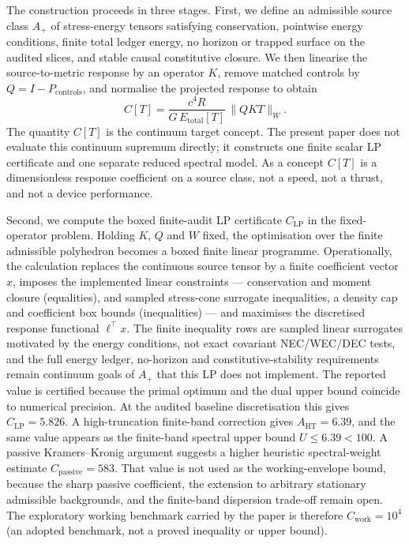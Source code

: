 \documentclass[11pt,a4paper]{article}
\begin{document}
The construction proceeds in three stages. First, we define an admissible source class $A_{+}$ of stress-energy tensors satisfying conservation, pointwise energy conditions, finite total ledger energy, no horizon or trapped surface on the audited slices, and stable causal constitutive closure. We then linearise the source-to-metric response by an operator $K$, remove matched controls by $Q=I-P_{\mathrm{controls}}$, and normalise the projected response to obtain
\[
C[T]=
\frac{c^{4}R}{G\,E_{\mathrm{total}}[T]}\,
\bigl\| Q K T \bigr\|_{W}.
\]
The quantity $C[T]$ is the continuum target concept. The present paper does not evaluate this continuum supremum directly; it constructs one finite scalar LP certificate and one separate reduced spectral model. As a concept $C[T]$ is a dimensionless response coefficient on a source class, not a speed, not a thrust, and not a device performance.

Second, we compute the boxed finite-audit LP certificate $C_{\mathrm{LP}}$ in the fixed-operator problem. Holding $K$, $Q$ and $W$ fixed, the optimisation over the finite admissible polyhedron becomes a boxed finite linear programme. Operationally, the calculation replaces the continuous source tensor by a finite coefficient vector $x$, imposes the implemented linear constraints --- conservation and moment closure (equalities), and sampled stress-cone surrogate inequalities, a density cap and coefficient box bounds (inequalities) --- and maximises the discretised response functional $\ell^{\top}x$. The finite inequality rows are sampled linear surrogates motivated by the energy conditions, not exact covariant NEC/WEC/DEC tests, and the full energy ledger, no-horizon and constitutive-stability requirements remain continuum goals of $A_{+}$ that this LP does not implement. The reported value is certified because the primal optimum and the dual upper bound coincide to numerical precision. At the audited baseline discretisation this gives $C_{\mathrm{LP}}=5.826$. A high-truncation finite-band correction gives $A_{\mathrm{HT}}=6.39$, and the same value appears as the finite-band spectral upper bound $U\leq6.39<100$. A passive Kramers--Kronig argument suggests a higher heuristic spectral-weight estimate $C_{\mathrm{passive}}=583$. That value is not used as the working-envelope bound, because the sharp passive coefficient, the extension to arbitrary stationary admissible backgrounds, and the finite-band dispersion trade-off remain open. The exploratory working benchmark carried by the paper is therefore $C_{\mathrm{work}}=10^{4}$ (an adopted benchmark, not a proved inequality or upper bound).
\end{document}
